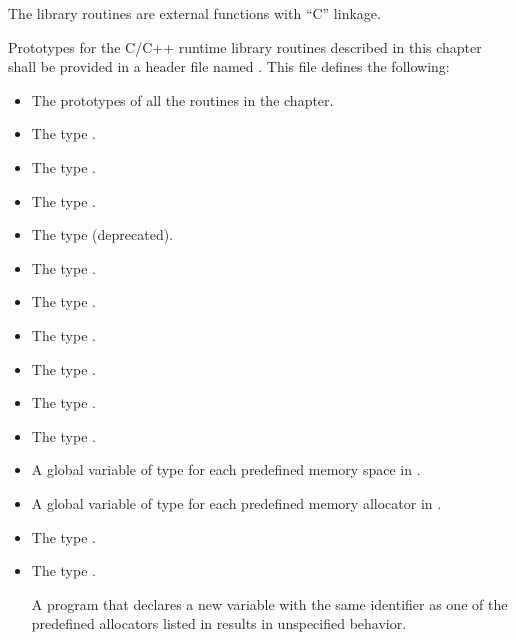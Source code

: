 \begin{ccppspecific}
The library routines are external functions with ``C'' linkage.

Prototypes for the C/C++ runtime library routines described in this chapter shall be
provided in a header file named . This file defines the following:

\begin{itemize}
\item The prototypes of all the routines in the chapter.

\item The type .

\item The type .

\item The type .

\item The type  (deprecated).

\item The type .

\item The type .

\item The type .

\item The type .

\item The type .

\item The type .

\item A global variable of type  for each predefined memory space in .

\item A global variable of type  for each predefined memory allocator in .

\item The type .

\item The type .

A program that declares a new variable with the same identifier as one of the predefined allocators listed in  results in unspecified behavior.

\end{itemize}


\end{ccppspecific}

